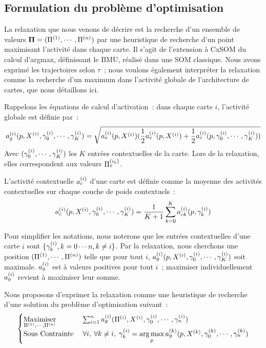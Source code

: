 \documentclass[../main]{subfiles}
\begin{document}
\subsection{Formulation du problème d'optimisation}\label{sec:formulation_argmax}

La relaxation que nous venons de décrire est la recherche d'un ensemble de valeurs $\mathbf{\Pi} = (\Pi^{({1})}, \cdots, \Pi^{({n})})$ par une heuristique de recherche d'un point maximisant l'activité dans chaque carte. Il s'agit de l'extension à CxSOM du calcul d'argmax, définissant le BMU, réalisé dans une SOM classique. 
Nous avons exprimé les trajectoires selon $\tau$~; nous voulons également interpréter la relaxation comme la recherche d'un maximum dans l'activité globale de l'architecture de cartes, que nous détaillons ici. 

Rappelons les équations de calcul d'activation~:
dans chaque carte $i$, l'activité globale est définie par~:
\begin{equation}\label{eq:ag}
	a_g^{({i})}(p, X^{({i})}, \gamma^{({i})}_0, \cdots, \gamma^{({i})}_K) = \sqrt{a_e^{({i})}(p,X^{({i})})(\frac{1}{2}a_e^{({i})}(p,X^{({i})}) + \frac{1}{2}a_c^{({i})}(p,\gamma^{({i})}_0, \cdots, \gamma^{({i})}_K))}
\end{equation}
Avec $(\gamma^{({i})}_0, \cdots, \gamma^{({i})}_K)$ les $K$ entrées contextuelles de la carte. Lors de la relaxation, elles correspondent aux valeurs $\Pi^{({i_k})}_\tau$.

L'activité contextuelle $a_c^{({i})}$ d'une carte est définie comme la moyenne des activités contextuelles sur chaque couche de poids contextuels~:
\begin{equation}
	a_c^{({i})}(p,  X^{({i})}, \gamma^{({i})}_0, \cdots, \gamma^{({i})}_K) = \frac{1}{K+1}\sum_{k=0}^{K}{a_{ck}^{({i})}(p, \gamma^{({i})}_k)}
\end{equation}

Pour simplifier les notations, nous noterons que les entrées contextuelles d'une carte $i$ sont $\{ \gamma^{({i})}_k, k = 0 \cdots n , k \neq i  \}$.
Par la relaxation, nous cherchons une position $(\Pi^{({1})}, \cdots, \Pi^{({n})})$ telle que pour tout $i$, $a_g^{({i})}(p,  X^{({i})}, \gamma^{({i})}_0, \cdots, \gamma^{({i})}_K)$ soit maximale. $a_g^{({i})}$ est à valeurs positives pour tout $i$~; maximiser individuellement $a_g^{({i})}$ revient à maximiser leur somme.

Nous proposons d'exprimer la relaxation comme une heuristique de recherche d'une solution du problème d'optimisation suivant~:
\begin{equation}\label{eq:opti}
	\begin{cases}
	\operatorname*{Maximiser}\limits_{\Pi^{({1})}, \cdots, \Pi^{({n})}}\;& \sum_{i = 1}^n a_g^{({i})}(\Pi^{({i})},X^{({i})},\gamma_0^{({i})}, \cdots, \gamma_n^{({i})}) \\
	\text{Sous Contrainte}\; &\forall i,\:\forall k \neq i, \; \gamma_k^{({i})} = \operatorname*{arg\,max}\limits_p a_g^{({k})}(p, X^{({k})}, \gamma_0^{({k})}, \cdots, \gamma_n^{({k})})
	\end{cases}
\end{equation}
\end{document}
